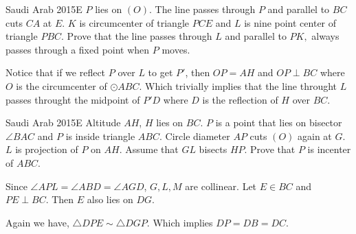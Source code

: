 \newpage

\begin{minipage}{.5\textwidth} 

\end{minipage}\hfill%
\begin{minipage}{.48\textwidth} 
\end{minipage}

\begin{minipage}{.6\linewidth}
    {Saudi Arab 2015}{E}{
        $P$ lies on $(O)$. The line passes through $P$ and parallel to $BC$
        cuts $CA$ at $E$. $K$ is circumcenter of triangle $PCE$ and $L$ is
        nine point center of triangle $PBC$. Prove that the line passes
        through $L$ and parallel to $PK,$ always passes through a fixed point
        when $P$ moves.
    }

    \begin{solution}[Construction] 
        Notice that if we reflect $ P $ over $ L $
        to get $ P' $, then $ OP=AH $ and $ OP\perp BC $ where $ O $ is the
        circumcenter of $ \odot ABC $. Which trivially implies that the line
        throught $ L $ passes throught the midpoint of $ P'D $ where $ D $ is
        the reflection of $ H $ over $ BC $.  
    \end{solution} 

    {Saudi Arab 2015}{E}{
        Altitude $AH$, $H$ lies on $BC$. $P$ is a point that
        lies on bisector $\angle BAC$ and $P$ is inside triangle $ABC$. Circle
        diameter $AP$ cuts $(O)$ again at $G$. $L$ is projection of $P$ on $AH$.
        Assume that $GL$ bisects $HP$. Prove that $P$ is incenter of $ABC$.
    }

    \begin{solution} Since $ \angle APL = \angle ABD = \angle AGD
        $, $ G, L, M $ are collinear. Let $ E\in BC $ and $ PE\perp BC $. Then
        $ E $ also lies on $ DG $. 

        Again we have, $ \triangle DPE\sim \triangle DGP $. Which implies $
        DP=DB=DC $.  
    \end{solution} 
\end{minipage}\hfill%
\begin{minipage}{.35\linewidth}
\end{minipage}


